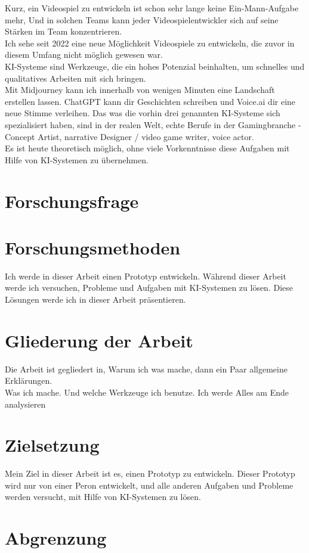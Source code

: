Kurz, ein Videospiel zu entwickeln ist schon sehr lange keine Ein-Mann-Aufgabe mehr, Und in solchen Teams kann jeder Videospielentwickler sich auf seine Stärken im Team konzentrieren.
\\
Ich sehe seit 2022 eine neue Möglichkeit Videospiele zu entwickeln, die zuvor in diesem Umfang nicht möglich gewesen war.
\\
KI-Systeme sind Werkzeuge, die ein hohes Potenzial beinhalten, um schnelles und qualitatives Arbeiten mit sich bringen.
\\
Mit Midjourney kann ich innerhalb von wenigen Minuten eine Landschaft erstellen lassen. ChatGPT kann dir Geschichten schreiben und Voice.ai dir eine neue Stimme verleihen. Das was die vorhin drei genannten KI-Systeme sich spezialisiert haben, sind in der realen
Welt, echte Berufe in der Gamingbranche - Concept Artist, narrative Designer / video game writer, voice actor.
\\
Es ist heute theoretisch möglich, ohne viele Vorkenntnisse diese Aufgaben mit Hilfe von KI-Systemen zu übernehmen.
\section{Forschungsfrage}

\section{Forschungsmethoden}
Ich werde in dieser Arbeit einen Prototyp entwickeln. Während dieser Arbeit werde ich versuchen, Probleme und Aufgaben mit KI-Systemen zu lösen. Diese Lösungen werde ich in dieser Arbeit präsentieren.
\section{Gliederung der Arbeit}%
Die Arbeit ist gegliedert in, Warum ich was mache, dann ein Paar allgemeine Erklärungen.
\\
Was ich mache. Und welche Werkzeuge ich benutze. Ich werde Alles am Ende analysieren

\section{Zielsetzung}
Mein Ziel in dieser Arbeit ist es, einen Prototyp zu entwickeln. Dieser Prototyp wird nur von einer Peron entwickelt, und alle anderen Aufgaben und Probleme werden versucht, mit Hilfe von KI-Systemen zu lösen.

\section{Abgrenzung}
